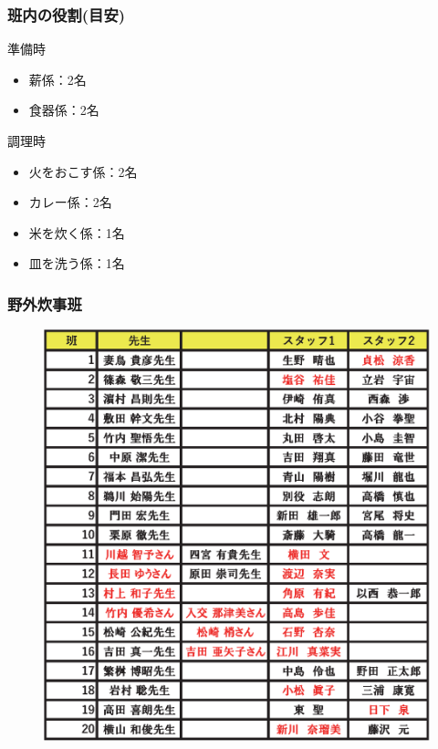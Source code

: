 \subsubsection{班内の役割(目安)}

準備時
\begin{itemize}
  \item 薪係：2名
  \item 食器係：2名
\end{itemize}

調理時
\begin{itemize}
  \item 火をおこす係：2名
  \item カレー係：2名
  \item 米を炊く係：1名
  \item 皿を洗う係：1名
\end{itemize}

\subsubsection{野外炊事班}
\begin{figure}[H]
\begin{center}
\includegraphics[scale=0.9]{./09/yagaisuijihanwake.eps}
\end{center}
\end{figure}


